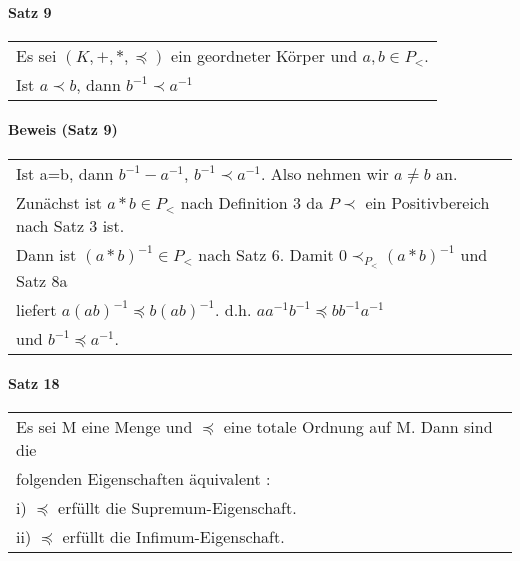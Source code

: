 \documentclass[a4paper]{scrartcl}
\begin{document}
\paragraph{Satz 9}
\begin{tabbing}
\begin{tabular}{l}
Es sei $(K,+,*,\preceq)$ ein geordneter Körper und $a,b\in P_<$.\\
Ist $a\prec b$, dann $b^{-1} \prec a^{-1}$
\end{tabular}
\end{tabbing}

\paragraph{Beweis (Satz 9)}
\begin{tabbing}
\begin{tabular}{l}
Ist a=b, dann $b^{-1}-a^{-1}$, $b^{-1} \prec a^{-1}$. Also nehmen wir $a \neq b$ an.\\
Zunächst ist $a*b\in P_<$ nach Definition 3 da $P\prec$ ein Positivbereich nach Satz 3 ist.\\
Dann ist $(a*b)^{-1}\in P_<$ nach Satz 6. Damit $0 \prec_{P_<} (a*b)^{-1}$ und Satz 8a\\
liefert $a(ab)^{-1} \preceq b(ab)^{-1}$. d.h. $aa^{-1}b^{-1} \preceq bb^{-1}a^{-1}$\\
und $b^{-1} \preceq a^{-1}$.
\end{tabular}
\end{tabbing}










\paragraph{Satz 18}
\begin{tabbing}
\begin{tabular}{l}
Es sei M eine Menge und $ \preceq $ eine totale Ordnung auf M. Dann sind die\\
folgenden Eigenschaften äquivalent : \\
i) $ \preceq $ erfüllt die Supremum-Eigenschaft.\\
ii) $ \preceq $ erfüllt die Infimum-Eigenschaft.
\end{tabular}
\end{tabbing}
\end{document}
